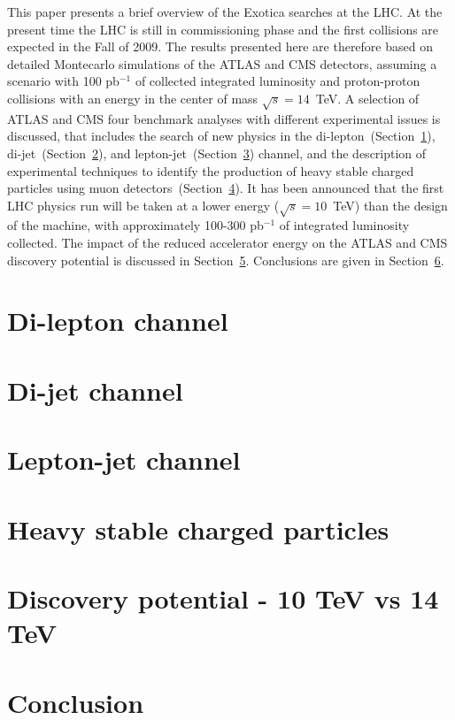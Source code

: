 \documentclass{cimento}
\begin{document}
This paper presents a brief overview of the Exotica searches at the LHC. 
At the present time the LHC is still in commissioning phase 
and the first collisions are expected in the Fall of 2009.
The results presented here are therefore based on detailed 
Montecarlo simulations of the ATLAS and CMS detectors, 
assuming a scenario with 100 pb$^{-1}$ of collected integrated luminosity 
and proton-proton collisions with an energy in the center of mass $\sqrt{s} = 14$~TeV. 
A selection of ATLAS and CMS four benchmark analyses with different 
experimental issues is discussed, that includes 
the search of new physics in the di-lepton~(Section~\ref{dilepton}), 
di-jet~(Section~\ref{dijet}), and lepton-jet~(Section~\ref{leptonjet}) channel, 
and the description of experimental techniques to identify the production of 
heavy stable charged particles using muon detectors~(Section~\ref{HSCP}).
It has been announced that the first LHC physics run 
will be taken at a lower energy ($\sqrt{s} = 10$~TeV) 
than the design of the machine, with approximately 100-300 pb$^{-1}$ 
of integrated luminosity collected. 
The impact of the reduced accelerator energy on the ATLAS and CMS 
discovery potential is discussed in Section~\ref{10TeVvs14TeV}. 
Conclusions are given in Section~\ref{Conclusion}.

\section{Di-lepton channel} \label{dilepton}

\section{Di-jet channel} \label{dijet}
 
\section{Lepton-jet channel} \label{leptonjet}

\section{Heavy stable charged particles} \label{HSCP}

\section{Discovery potential - 10 TeV vs 14 TeV} \label{10TeVvs14TeV}

\section{Conclusion} \label{Conclusion}
\end{document}
